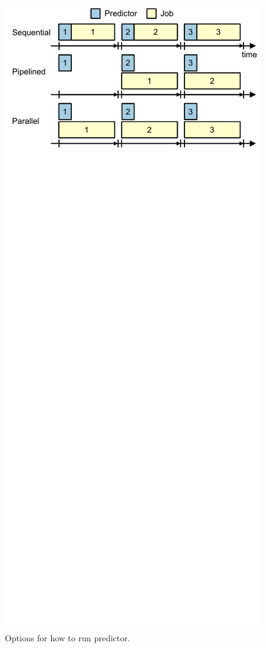 \begin{figure}
  \begin{center}
    \includegraphics{exec_time_prediction/figs/predictor_operation.pdf}
    \caption{Options for how to run predictor.}
    \label{fig:exec_time_prediction.system.predictor_operation}
  \end{center}
\end{figure}


